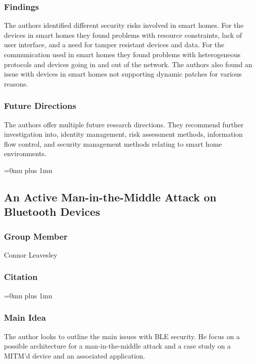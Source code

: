 \subsubsection{Findings}

\noindent
The authors identified different security risks involved in smart homes. For the devices in smart homes they found problems with resource constraints, lack of user interface, and a need for tamper resistant devices and data. For the communication used in smart homes they found problems with heterogeneous protocols and devices going in and out of the network. The authors also found an issue with devices in smart homes not supporting dynamic patches for various reasons. 

\subsubsection{Future Directions}

\noindent
The authors offer multiple future research directions. They recommend further investigation into, identity management, risk assessment methods, information flow control, and security management methods relating to smart home environments. 

\Urlmuskip=0mu plus 1mu\relax

\noindent
\subsection{An Active Man-in-the-Middle Attack on Bluetooth Devices}

\subsubsection{Group Member}

\noindent
Connor Leavesley

\noindent
\subsubsection{Citation}

\Urlmuskip=0mu plus 1mu\relax

\subsubsection{Main Idea}

\noindent
The author looks to outline the main issues with BLE security. He focus on a possible architecture for a man-in-the-middle attack and a case study on a MITM'd device and an associated application. 


